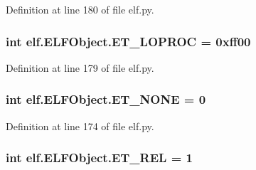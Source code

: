 Definition at line 180 of file elf.\+py.

\subsubsection[{\texorpdfstring{E\+T\+\_\+\+L\+O\+P\+R\+OC}{ET_LOPROC}}]{\setlength{\rightskip}{0pt plus 5cm}int elf.\+E\+L\+F\+Object.\+E\+T\+\_\+\+L\+O\+P\+R\+OC = 0xff00\hspace{0.3cm}{\ttfamily [static]}}\hypertarget{clasself_1_1_e_l_f_object_a6305c5a041a4579c666bcc4a6caa088c}{}\label{clasself_1_1_e_l_f_object_a6305c5a041a4579c666bcc4a6caa088c}


Definition at line 179 of file elf.\+py.

\subsubsection[{\texorpdfstring{E\+T\+\_\+\+N\+O\+NE}{ET_NONE}}]{\setlength{\rightskip}{0pt plus 5cm}int elf.\+E\+L\+F\+Object.\+E\+T\+\_\+\+N\+O\+NE = 0\hspace{0.3cm}{\ttfamily [static]}}\hypertarget{clasself_1_1_e_l_f_object_aaf68bf2b20161d9875d2e56d9e2d10c0}{}\label{clasself_1_1_e_l_f_object_aaf68bf2b20161d9875d2e56d9e2d10c0}


Definition at line 174 of file elf.\+py.

\subsubsection[{\texorpdfstring{E\+T\+\_\+\+R\+EL}{ET_REL}}]{\setlength{\rightskip}{0pt plus 5cm}int elf.\+E\+L\+F\+Object.\+E\+T\+\_\+\+R\+EL = 1\hspace{0.3cm}{\ttfamily [static]}}\hypertarget{clasself_1_1_e_l_f_object_a62458e3aa560c823484e38ecd1129e2d}{}\label{clasself_1_1_e_l_f_object_a62458e3aa560c823484e38ecd1129e2d}


